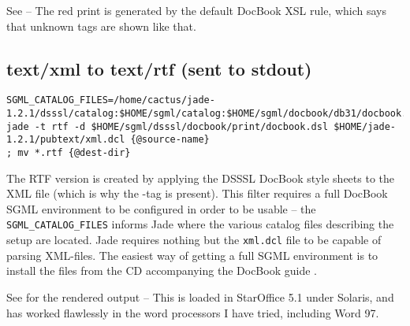 See  -- The red print is
  generated by the default DocBook XSL rule, which says that unknown
  tags are shown like that.
\subsection*{text/xml to text/rtf (sent to stdout)}
  {\footnotesize
\begin{verbatim}
SGML_CATALOG_FILES=/home/cactus/jade-1.2.1/dsssl/catalog:$HOME/sgml/catalog:$HOME/sgml/docbook/db31/docbook.cat
jade -t rtf -d $HOME/sgml/dsssl/docbook/print/docbook.dsl $HOME/jade-1.2.1/pubtext/xml.dcl {@source-name} 
; mv *.rtf {@dest-dir} 
\end{verbatim} 
}

The RTF version is created by applying the DSSSL DocBook style sheets
to the XML file (which is why the -tag is present).
This filter requires a full DocBook SGML environment to be configured
in order to be usable -- the \texttt{SGML_CATALOG_FILES} informs Jade
where the various catalog files describing the setup are located.
Jade requires nothing but the \texttt{xml.dcl} file to be capable of
parsing XML-files.  The easiest way of getting a full SGML environment
is to install the files from the CD accompanying the DocBook guide
\cite{walsh-muellner:docbook-the-definitive-guide}.

See  for the rendered output -- This is loaded in
  StarOffice 5.1 under Solaris, and has worked flawlessly in the word
  processors I have tried, including Word 97.



















